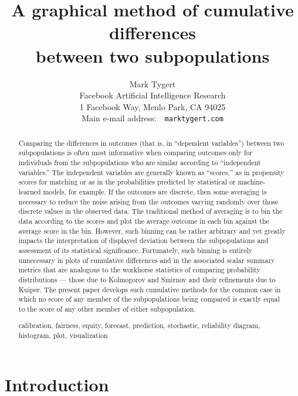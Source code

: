 \documentclass{article}
\title{A graphical method of cumulative differences\\between two subpopulations}
\author{Mark Tygert\\{\normalsize Facebook Artificial Intelligence Research}\\
{\normalsize 1 Facebook Way, Menlo Park, CA 94025}\\
{\normalsize Main e-mail address:\ \ {\tt mark\symbol{64}tygert.com}}}
\begin{document}
\maketitle



\begin{abstract}
Comparing the differences in outcomes (that is, in ``dependent variables'')
between two subpopulations
is often most informative when comparing outcomes only for individuals
from the subpopulations who are similar according to ``independent variables.''
The independent variables are generally known as ``scores,''
as in propensity scores for matching or as in the probabilities predicted
by statistical or machine-learned models, for example.
If the outcomes are discrete, then some averaging is necessary
to reduce the noise arising from the outcomes varying randomly
over those discrete values in the observed data.
The traditional method of averaging is to bin the data according to the scores
and plot the average outcome in each bin against the average score in the bin.
However, such binning can be rather arbitrary and yet greatly impacts
the interpretation of displayed deviation between the subpopulations
and assessment of its statistical significance.
Fortunately, such binning is entirely unnecessary in plots
of cumulative differences and in the associated scalar summary metrics that are
analogous to the workhorse statistics of comparing probability distributions
--- those due to Kolmogorov and Smirnov and their refinements due to Kuiper.
The present paper develops such cumulative methods
for the common case in which no score of any member
of the subpopulations being compared is exactly equal to the score
of any other member of either subpopulation.

\bigskip

 calibration, fairness, equity, forecast,
prediction, stochastic, reliability diagram, histogram, plot, visualization

\end{abstract}



\section{Introduction}
\label{intro}
\end{document}
